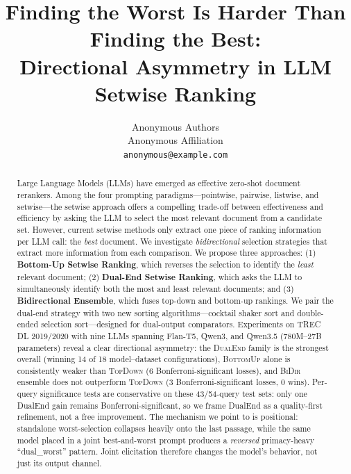 \documentclass[11pt]{article}
\title{Finding the Worst Is Harder Than Finding the Best:\\ Directional Asymmetry in LLM Setwise Ranking}
\author{Anonymous Authors \\
  Anonymous Affiliation \\
  \texttt{anonymous@example.com}}
\newcommand{\topdown}{\textsc{TopDown}}
\newcommand{\bottomup}{\textsc{BottomUp}}
\newcommand{\dualend}{\textsc{DualEnd}}
\newcommand{\bidir}{\textsc{BiDir}}
\begin{document}
\maketitle
\begin{abstract}
Large Language Models (LLMs) have emerged as effective zero-shot document rerankers. Among the four prompting paradigms---pointwise, pairwise, listwise, and setwise---the setwise approach offers a compelling trade-off between effectiveness and efficiency by asking the LLM to select the most relevant document from a candidate set. However, current setwise methods only extract one piece of ranking information per LLM call: the \emph{best} document. We investigate \emph{bidirectional} selection strategies that extract more information from each comparison. We propose three approaches: (1) \textbf{Bottom-Up Setwise Ranking}, which reverses the selection to identify the \emph{least} relevant document; (2) \textbf{Dual-End Setwise Ranking}, which asks the LLM to simultaneously identify both the most and least relevant documents; and (3) \textbf{Bidirectional Ensemble}, which fuses top-down and bottom-up rankings. We pair the dual-end strategy with two new sorting algorithms---cocktail shaker sort and double-ended selection sort---designed for dual-output comparators. Experiments on TREC DL 2019/2020 with nine LLMs spanning Flan-T5, Qwen3, and Qwen3.5 (780M--27B parameters) reveal a clear directional asymmetry: the \dualend{} family is the strongest overall (winning 14 of 18 model--dataset configurations), \bottomup{} alone is consistently weaker than \topdown{} (6 Bonferroni-significant losses), and \bidir{} ensemble does not outperform \topdown{} (3 Bonferroni-significant losses, 0 wins). Per-query significance tests are conservative on these 43/54-query test sets: only one DualEnd gain remains Bonferroni-significant, so we frame DualEnd as a quality-first refinement, not a free improvement. The mechanism we point to is positional: standalone worst-selection collapses heavily onto the last passage, while the same model placed in a joint best-and-worst prompt produces a \emph{reversed} primacy-heavy ``dual\_worst'' pattern. Joint elicitation therefore changes the model's behavior, not just its output channel.
\end{abstract}











%


\appendix


\end{document}
